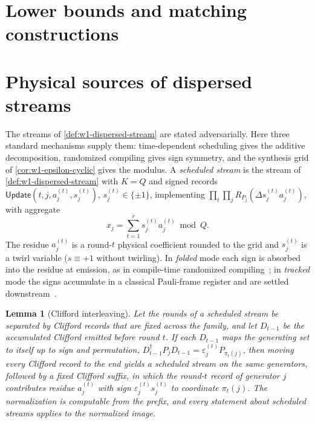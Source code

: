 \documentclass[aps,prx,reprint,superscriptaddress,floatfix,longbibliography]{revtex4-2}
\newtheorem{lemma}{Lemma}
\begin{document}
\section{Lower bounds and matching constructions}
\label{sec:w1-unified-frontier}
\label{sec:reduction}
\label{sec:w1-randomized-multipass}




\section{Physical sources of dispersed streams}
\label{sec:physical-dispersed}

The streams of \cref{def:w1-dispersed-stream} are stated adversarially.
Here three standard mechanisms supply them: time-dependent scheduling
gives the additive decomposition, randomized compiling gives sign
symmetry, and the synthesis grid of \cref{cor:w1-epsilon-cyclic} gives the
modulus.  A \emph{scheduled stream} is the stream of
\cref{def:w1-dispersed-stream} with $K=Q$ and signed records
$\mathsf{Update}(t,j,a_j^{(t)},s_j^{(t)})$, $s_j^{(t)}\in\{\pm1\}$,
implementing $\prod_t\prod_jR_{P_j}(\Delta s_j^{(t)}a_j^{(t)})$, with
aggregate
\begin{equation}\label{eq:scheduled-aggregate}
 x_j=\sum_{t=1}^r s_j^{(t)}a_j^{(t)}\bmod Q .
\end{equation}
\label{def:scheduled-stream}%
The residue $a_j^{(t)}$ is a round-$t$ physical coefficient rounded to the
grid and $s_j^{(t)}$ is a twirl variable ($s\equiv+1$ without twirling).
In \emph{folded} mode each sign is absorbed into the residue at emission,
as in compile-time randomized
compiling~\cite{wallman2016noise,hashim2021randomized}; in \emph{tracked}
mode the signs accumulate in a classical Pauli-frame register and are
settled downstream~\cite{knill2005realistically,riesebos2017pauli}.

\begin{lemma}[Clifford interleaving]
\label{lem:clifford-interleaving}
Let the rounds of a scheduled stream be separated by Clifford records that
are fixed across the family, and let $D_{t-1}$ be the accumulated Clifford
emitted before round $t$.  If each $D_{t-1}$ maps the generating set to
itself up to sign and permutation,
$D_{t-1}^\dagger P_jD_{t-1}=\varepsilon_j^{(t)}P_{\pi_t(j)}$, then moving
every Clifford record to the end yields a scheduled stream on the same
generators, followed by a fixed Clifford suffix, in which the round-$t$
record of generator $j$ contributes residue $a_j^{(t)}$ with sign
$\varepsilon_j^{(t)}s_j^{(t)}$ to coordinate $\pi_t(j)$.  The
normalization is computable from the prefix, and every statement about
scheduled streams applies to the normalized image.
\end{lemma}
\end{document}
